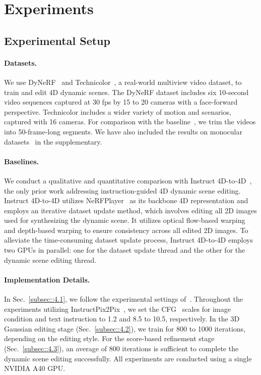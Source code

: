 \section{Experiments}
\subsection{Experimental Setup}
\paragraph{Datasets.}
We use DyNeRF~\cite{ref_37_neural3dvideo} and Technicolor~\cite{ref_71_technicolor}, a real-world multiview video dataset, to train and edit 4D dynamic scenes. The DyNeRF dataset includes six 10-second video sequences captured at 30 fps by 15 to 20 cameras with a face-forward perspective. Technicolor includes a wider variety of motion and scenarios, captured with 16 cameras. For comparison with the baseline~\cite{ref_1_ip2p}, we trim the videos into 50-frame-long segments. We have also included the results on monocular datasets~\cite{ref_73_hypernerf,ref_72_dycheck} in the supplementary.


\vspace{-4mm}\paragraph{Baselines.}
We conduct a qualitative and quantitative comparison with Instruct 4D-to-4D~\cite{ref_9_i4d24d}, the only prior work addressing instruction-guided 4D dynamic scene editing. Instruct 4D-to-4D utilizes NeRFPlayer~\cite{ref_22_nerfplayer} as its backbone 4D representation and employs an iterative dataset update method, which involves editing all 2D images used for synthesizing the dynamic scene. It utilizes optical flow-based warping~\cite{ref_53_raft} and depth-based warping to ensure consistency across all edited 2D images. To alleviate the time-consuming dataset update process, Instruct 4D-to-4D employs two GPUs in parallel: one for the dataset update thread and the other for the dynamic scene editing thread.
\vspace{-5mm}\paragraph{Implementation Details.}
In Sec.~\ref{subsec::4.1}, we follow the experimental settings of~\cite{ref_10_4dgs}. Throughout the experiments utilizing InstructPix2Pix~\cite{ref_1_ip2p}, we set the CFG~\cite{ref_43_classifierfree} scales for image condition and text instruction to 1.2 and 8.5 to 10.5, respectively. In the 3D Gaussian editing stage (Sec.~\ref{subsec::4.2}), we train for 800 to 1000 iterations, depending on the editing style. For the score-based refinement stage (Sec.~\ref{subsec::4.3}), an average of 800 iterations is sufficient to complete the dynamic scene editing successfully. All experiments are conducted using a single NVIDIA A40 GPU.


